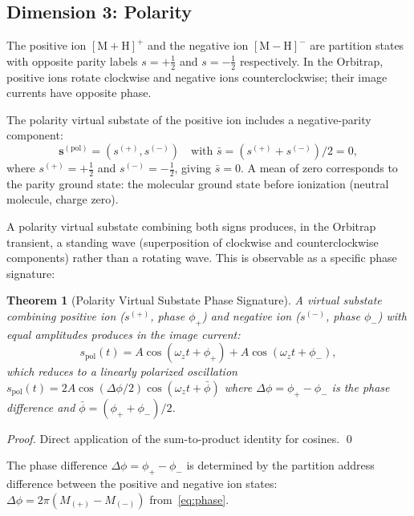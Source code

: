 \documentclass[twocolumn,10pt,a4paper]{article}
\theoremstyle{thmstyle}
\newtheorem{theorem}{Theorem}[section]
\theoremstyle{definition}
\theoremstyle{remark}
\begin{document}
\subsection{Dimension 3: Polarity}

The positive ion $[\mathrm{M+H}]^+$ and the negative ion $[\mathrm{M-H}]^-$
are partition states with opposite parity labels $s = +\tfrac{1}{2}$
and $s = -\tfrac{1}{2}$ respectively. In the Orbitrap, positive ions
rotate clockwise and negative ions counterclockwise; their image currents
have opposite phase.

The polarity virtual substate of the positive ion includes a
negative-parity component:
\begin{equation}
\mathbf{s}^{(\text{pol})} = \left(s^{(+)}, s^{(-)}\right)
\quad \text{with } \bar{s} = (s^{(+)} + s^{(-)})/2 = 0,
\label{eq:polarity-vs}
\end{equation}
where $s^{(+)} = +\tfrac{1}{2}$ and $s^{(-)} = -\tfrac{1}{2}$, giving
$\bar{s} = 0$. A mean of zero corresponds to the parity ground state:
the molecular ground state before ionization (neutral molecule, charge zero).

A polarity virtual substate combining both signs produces, in the
Orbitrap transient, a standing wave (superposition of clockwise and
counterclockwise components) rather than a rotating wave. This is
observable as a specific phase signature:

\begin{theorem}[Polarity Virtual Substate Phase Signature]
\label{thm:polarity}
A virtual substate combining positive ion ($s^{(+)}$, phase $\phi_+$)
and negative ion ($s^{(-)}$, phase $\phi_-$) with equal amplitudes
produces in the image current:
\begin{equation}
s_{\mathrm{pol}}(t) = A\cos(\omega_z t + \phi_+) + A\cos(\omega_z t + \phi_-),
\label{eq:polarity-signal}
\end{equation}
which reduces to a linearly polarized oscillation
$s_{\mathrm{pol}}(t) = 2A\cos(\Delta\phi/2)\cos(\omega_z t + \bar{\phi})$
where $\Delta\phi = \phi_+ - \phi_-$ is the phase difference and
$\bar\phi = (\phi_++\phi_-)/2$.
\end{theorem}

\begin{proof}
Direct application of the sum-to-product identity for cosines. \qed
\end{proof}

The phase difference $\Delta\phi = \phi_+ - \phi_-$ is determined by
the partition address difference between the positive and negative ion
states: $\Delta\phi = 2\pi(M_{(+)} - M_{(-)})$ from~\eqref{eq:phase}.
\end{document}
